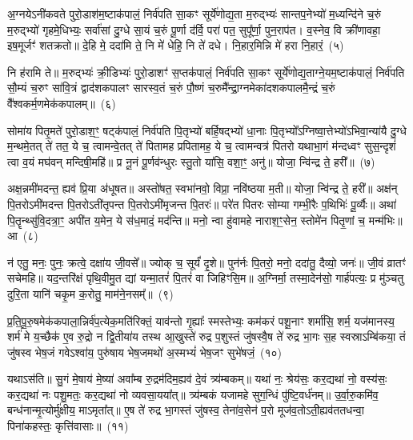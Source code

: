 {\anuvakamend[{व॒यं यद् विꣳ॑श॒तिश्च॑}]}

अ॒ग्नये\-ऽनी॑कवते पुरो॒डाश॑\-म॒ष्टा\-क॑पालं॒ निर्व॑पति सा॒कꣳ सूर्ये॑णोद्य॒ता म॒रुद्भ्यः॑ सान्तप॒नेभ्यो॑ म॒ध्यन्दि॑ने च॒रुं म॒रुद्भ्यो॑ गृहमे॒धिभ्यः॒ सर्वा॑सां दु॒ग्धे सा॒यं च॒रुं पू॒र्णा द॑र्वि॒ परा॑ पत॒ सुपू᳚र्णा॒ पुन॒राप॑त। व॒स्नेव॒ वि क्री॑णावहा॒ इष॒मूर्जꣳ॑ शतक्रतो॥ दे॒हि मे॒ ददा॑मि ते॒ नि मे॑ धेहि॒ नि ते॑ दधे। नि॒हार॒मिन्नि मे॑ हरा नि॒हारं॒~(५)\ip


नि ह॑रामि ते॥ म॒रुद्भ्यः॑ क्री॒डिभ्यः॑ पुरो॒डाशꣳ॑ स॒प्त\-क॑पालं॒ निर्व॑पति सा॒कꣳ सूर्ये॑णोद्य॒ताग्ने॒यम॒ष्टा\-क॑पालं॒ निर्व॑पति सौ॒म्यं च॒रुꣳ सा॑वि॒त्रं द्वाद॑श\-कपालꣳ सारस्व॒तं च॒रुं पौ॒ष्णं च॒रुमै᳚न्द्रा॒ग्नमेका॑\-दश\-कपालमै॒न्द्रं च॒रुं वै᳚श्वकर्म॒णमेक॑कपालम्॥~(६)\ip

{\anuvakamend[{ह॒रा॒ नि॒हारं॑ त्रि॒ꣳ॒शच्च॑}]}

सोमा॑य पितृ॒मते॑ पुरो॒डाश॒ꣳ॒ षट्\-क॑पालं॒ निर्व॑पति पि॒तृभ्यो॑ बर्\mbox{}हि॒षद्भ्यो॑ धा॒नाः पि॒तृभ्यो᳚\-ऽग्निष्वा॒त्तेभ्यो॑\-ऽभिवा॒न्या॑यै दु॒ग्धे म॒न्थमे॒तत् ते॑ तत॒ ये च॒ त्वामन्वे॒तत् ते॑ पितामह प्रपितामह॒ ये च॒ त्वामन्वत्र॑ पितरो यथाभा॒गं म॑न्दध्वꣳ सुस॒न्दृशं॑ त्वा व॒यं मघ॑वन् मन्दिषी॒महि॑॥ प्र नू॒नं पू॒र्णव॑न्धुरः स्तु॒तो या॑सि॒ वशा॒ꣳ॒ अनु॑॥ योजा॒ न्वि॑न्द्र ते॒ हरी᳚॥~(७)\ip

अक्ष॒न्नमी॑मदन्त॒ ह्यव॑ प्रि॒या अ॑धूषत॥ अस्तो॑षत॒ स्वभा॑नवो॒ विप्रा॒ नवि॑ष्ठया म॒ती॥ योजा॒ न्वि॑न्द्र ते॒ हरी᳚॥ अक्ष॑न् पि॒तरो\-ऽमी॑मदन्त पि॒तरो\-ऽती॑तृपन्त पि॒तरो\-ऽमी॑मृजन्त पि॒तरः॑॥ परे॑त पितरः सोम्या गम्भी॒रैः प॒थिभिः॑ पू॒र्व्यैः॥ अथा॑ पि॒तॄन्थ्सु॑वि॒दत्रा॒ꣳ॒ अपी॑त य॒मेन॒ ये स॑ध॒मादं॒ मद॑न्ति॥ मनो॒ न्वा हु॑वामहे नाराश॒ꣳ॒सेन॒ स्तोमे॑न पितृ॒णां च॒ मन्म॑भिः॥ आ~(८)\ip

न॑ एतु॒ मनः॒ पुनः॒ क्रत्वे॒ दक्षा॑य जी॒वसे᳚॥ ज्योक् च॒ सूर्यं॑ दृ॒शे॥ पुन॑र्नः पि॒तरो॒ मनो॒ ददा॑तु॒ दैव्यो॒ जनः॑॥ जी॒वं व्रातꣳ॑ सचेमहि॥ यद॒न्तरि॑क्षं पृथि॒वीमु॒त द्यां यन्मा॒तरं॑ पि॒तरं॑ वा जिहिꣳसि॒म॥ अ॒ग्निर्मा॒ तस्मा॒देन॑सो॒ गार्\mbox{}ह॑पत्यः॒ प्र मु॑ञ्चतु दुरि॒ता यानि॑ चकृ॒म क॒रोतु॒ माम॑ने॒नसम्᳚॥~(९)\ip

{\anuvakamend[{हरी॒ मन्म॑भि॒रा चतु॑श्चत्वारिꣳशच्च}]}

प्र॒ति॒पू॒रु॒षमेक॑कपाला॒न्निर्व॑प॒त्येक॒\-मति॑रिक्तं॒ याव॑न्तो गृ॒ह्याः᳚ स्मस्तेभ्यः॒ कम॑करं पशू॒नाꣳ शर्मा॑सि॒ शर्म॒ यज॑मानस्य॒ शर्म॑ मे य॒च्छैक॑ ए॒व रु॒द्रो न द्वि॒तीया॑य तस्थ आ॒खुस्ते॑ रुद्र प॒शुस्तं जु॑षस्वै॒ष ते॑ रुद्र भा॒गः स॒ह स्वस्रा\-ऽम्बि॑कया॒ तं जु॑षस्व भेष॒जं गवे\-ऽश्वा॑य॒ पुरु॑षाय भेष॒जमथो॑ अ॒स्मभ्यं॑ भेष॒जꣳ सुभे॑षजं॒~(१०)\ip

यथा\-ऽस॑ति॥ सु॒गं मे॒षाय॑ मे॒ष्या॑ अवा᳚म्ब रु॒द्रम॑दिम॒ह्यव॑ दे॒वं त्र्य॑म्बकम्॥ यथा॑ नः॒ श्रेय॑सः॒ कर॒द्यथा॑ नो॒ वस्य॑सः॒ कर॒द्यथा॑ नः पशु॒मतः॒ कर॒द्यथा॑ नो व्यवसा॒यया᳚त्॥ त्र्य॑म्बकं यजामहे सुग॒न्धिं पु॑ष्टि॒वर्ध॑नम्॥ उ॒र्वा॒रु॒कमि॑व॒ बन्ध॑नान्मृ॒त्योर्मु॑क्षीय॒ मा\-ऽमृता᳚त्॥ ए॒ष ते॑ रुद्र भा॒गस्तं जु॑षस्व॒ तेना॑व॒सेन॑ प॒रो मूज॑व॒तो\-ऽती॒ह्यव॑ततधन्वा॒ पिना॑कहस्तः॒ कृत्ति॑वासाः॥~(११)\ip

